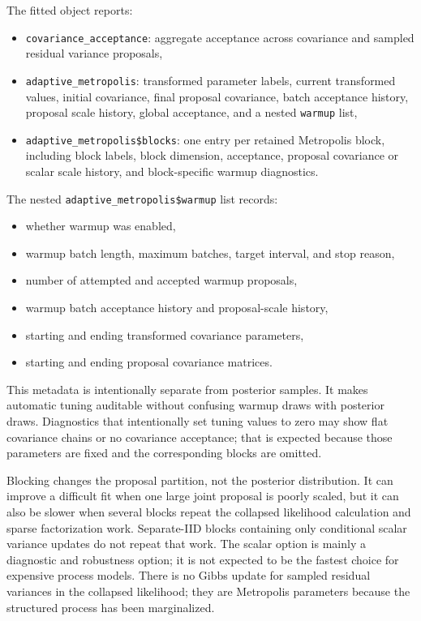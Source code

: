 \documentclass[11pt]{article}
\begin{document}
The fitted object reports:
\begin{itemize}
\item \texttt{covariance\_acceptance}: aggregate acceptance across covariance and sampled residual variance proposals,
\item \texttt{adaptive\_metropolis}: transformed parameter labels, current transformed values, initial covariance, final proposal covariance, batch acceptance history, proposal scale history, global acceptance, and a nested \texttt{warmup} list,
\item \texttt{adaptive\_metropolis\$blocks}: one entry per retained Metropolis block, including block labels, block dimension, acceptance, proposal covariance or scalar scale history, and block-specific warmup diagnostics.
\end{itemize}

The nested \texttt{adaptive\_metropolis\$warmup} list records:
\begin{itemize}
\item whether warmup was enabled,
\item warmup batch length, maximum batches, target interval, and stop reason,
\item number of attempted and accepted warmup proposals,
\item warmup batch acceptance history and proposal-scale history,
\item starting and ending transformed covariance parameters,
\item starting and ending proposal covariance matrices.
\end{itemize}

This metadata is intentionally separate from posterior samples. It makes automatic tuning auditable without confusing warmup draws with posterior draws. Diagnostics that intentionally set tuning values to zero may show flat covariance chains or no covariance acceptance; that is expected because those parameters are fixed and the corresponding blocks are omitted.

Blocking changes the proposal partition, not the posterior distribution. It can improve a difficult fit when one large joint proposal is poorly scaled, but it can also be slower when several blocks repeat the collapsed likelihood calculation and sparse factorization work. Separate-IID blocks containing only conditional scalar variance updates do not repeat that work. The scalar option is mainly a diagnostic and robustness option; it is not expected to be the fastest choice for expensive process models. There is no Gibbs update for sampled residual variances in the collapsed likelihood; they are Metropolis parameters because the structured process has been marginalized.
\end{document}
